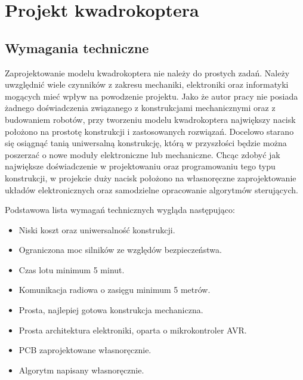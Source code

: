 
\chapter{Projekt kwadrokoptera} %

\label{Chapter5} %



\section{Wymagania techniczne}

Zaprojektowanie modelu kwadrokoptera nie należy do prostych zadań. Należy uwzględnić wiele czynników z zakresu mechaniki, elektroniki oraz informatyki mogących mieć wpływ na powodzenie projektu. Jako że autor pracy nie posiada żadnego doświadczenia związanego z konstrukcjami mechanicznymi oraz z budowaniem robotów, przy tworzeniu modelu kwadrokoptera największy nacisk położono na prostotę konstrukcji i zastosowanych rozwiązań. Docelowo starano się osiągnąć tanią uniwersalną konstrukcję, którą w przyszłości będzie można poszerzać o nowe moduły elektroniczne lub mechaniczne. Chcąc zdobyć jak największe doświadczenie w projektowaniu oraz programowaniu tego typu konstrukcji, w projekcie duży nacisk położono na własnoręczne zaprojektowanie układów elektronicznych oraz samodzielne opracowanie algorytmów sterujących.

Podstawowa lista wymagań technicznych wygląda następująco:

\begin{itemize}
	\item Niski koszt oraz uniwersalność konstrukcji.
	\item Ograniczona moc silników ze względów bezpieczeństwa.
	\item Czas lotu minimum 5 minut.
	\item Komunikacja radiowa o zasięgu minimum 5 metrów.
	\item Prosta, najlepiej gotowa konstrukcja mechaniczna.
	\item Prosta architektura elektroniki, oparta o mikrokontroler AVR.
	\item PCB zaprojektowane własnoręcznie.
	\item Algorytm napisany własnoręcznie.
\end{itemize}

